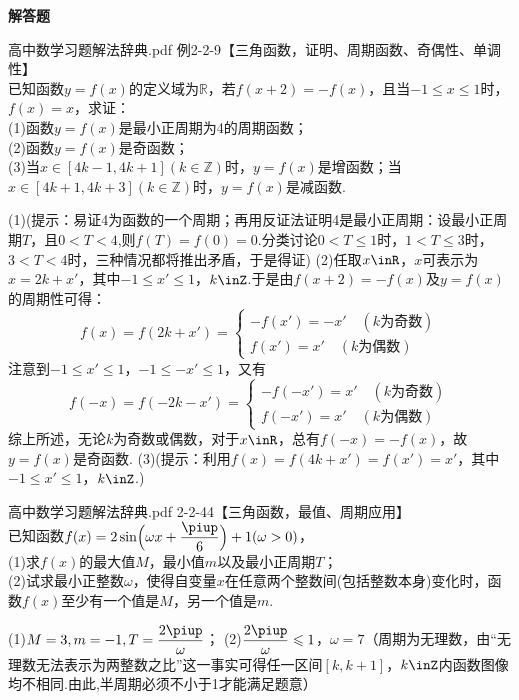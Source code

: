 \begin{exercise}{\bf 解答题}
\begin{answer}
      \end{answer}
    \item 高中数学习题解法辞典.pdf 例2-2-9【三角函数，证明、周期函数、奇偶性、单调性】\\
      已知函数$y=f(x)$的定义域为$\mathbb{R}$，若$f(x+2)=-f(x)$，且当$-1\leqslant x\leqslant 1$时，$f(x)=x$，求证：\\
      (1)函数$y=f(x)$是最小正周期为4的周期函数；\\
      (2)函数$y=f(x)$是奇函数；\\
      (3)当$x\in[4k-1,4k+1](k\in\mathbb{Z})$时，$y=f(x)$是增函数；当$x\in[4k+1,4k+3](k\in\mathbb{Z})$时，$y=f(x)$是减函数.
      \begin{answer}
        (1)(提示：易证4为函数的一个周期；再用反证法证明4是最小正周期：设最小正周期$T$，且$0<T<4$,则$f(T)=f(0)=0$.分类讨论$0<T\leqslant 1$时，$1<T\leqslant 3$时，$3<T<4$时，三种情况都将推出矛盾，于是得证)
        (2)任取$x\inR$，$x$可表示为$x=2k+x'$，其中$-1\leqslant x'\leqslant 1$，$k\inZ$.于是由$f(x+2)=-f(x)$及$y=f(x)$的周期性可得：
        \[f(x)=f(2k+x')=
          \begin{cases}
            -f(x')=-x'\quad(k\text{为奇数})\\
            f(x')=x'\quad(k\text{为偶数})
          \end{cases}
        \]
        注意到$-1\leqslant x'\leqslant 1$，$-1\leqslant -x'\leqslant 1$，又有
        \[f(-x)=f(-2k-x')=
          \begin{cases}
            -f(-x')=x'\quad(k\text{为奇数})\\
            f(-x')=x'\quad(k\text{为偶数})
          \end{cases}
        \]
        综上所述，无论$k$为奇数或偶数，对于$x\inR$，总有$f(-x)=-f(x)$，故$y=f(x)$是奇函数.
        (3)(提示：利用$f(x)=f(4k+x')=f(x')=x'$，其中$-1\leqslant x'\leqslant 1$，$k\inZ$.)
      \end{answer}
    \item 高中数学习题解法辞典.pdf 2-2-44【三角函数，最值、周期应用】\\
      已知函数$f(x)=2\sin\Bigl(\omega x+\dfrac{\piup}6\Bigr)+1(\omega>0)$，\\
      (1)求$f(x)$的最大值$M$，最小值$m$以及最小正周期$T$；\\
      (2)试求最小正整数$\omega$，使得自变量$x$在任意两个整数间(包括整数本身)变化时，函数$f(x)$至少有一个值是$M$，另一个值是$m$.
      \begin{answer}
        (1)$M=3,m=-1,T=\dfrac{2\piup}{\omega}$；
        (2)$\dfrac{2\piup}{\omega}\leqslant 1$，$\omega=7$（周期为无理数，由“无理数无法表示为两整数之比”这一事实可得任一区间$[k,k+1]$，$k\inZ$内函数图像均不相同.由此,半周期必须不小于1才能满足题意）

\end{answer}
\end{exercise}
